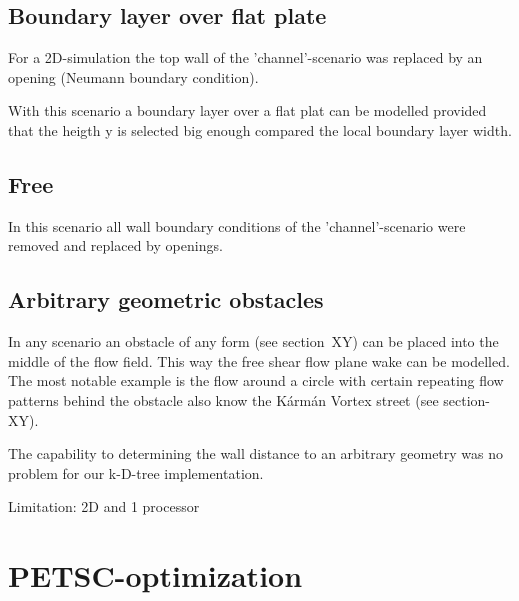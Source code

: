 
\subsection*{Boundary layer over flat plate} %
\label{sub:boundary_layer_over_flat_plate}

For a 2D-simulation the top wall of the 'channel'-scenario was replaced by an opening (Neumann boundary condition).

\noii With this scenario a boundary layer over a flat plat can be modelled provided that the heigth y is selected big enough compared the local boundary layer width.

\subsection*{Free} %
\label{sub:free}

In this scenario all wall boundary conditions of the 'channel'-scenario were removed and replaced by openings.

\subsection*{Arbitrary geometric obstacles} %
\label{sub:arbitrary_geometric_obstacles}

In any scenario an obstacle of any form (see section~XY) can be placed into the middle of the flow field. This way the free shear flow plane wake can be modelled. The most notable example is the flow around a circle with certain repeating flow patterns behind the obstacle also know the K\'{a}rm\'{a}n Vortex street (see section-XY).

\noii The capability to determining the wall distance to an arbitrary geometry was no problem for our k-D-tree implementation.

\noii Limitation: 2D and 1 processor



\newpage
\section{PETSC-optimization} %
\label{sec:petsc_optimization}


